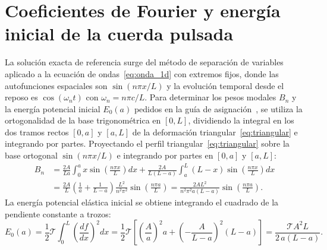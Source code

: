 \documentclass[11pt,a4paper]{article}
\begin{document}
\section{Coeficientes de Fourier y energía inicial de la cuerda pulsada}
\label{ap:coeficientes_bn}
La solución exacta de referencia surge del método de separación de variables aplicado a la ecuación de ondas~\eqref{eq:onda_1d} con extremos fijos, donde las autofunciones espaciales son $\sin(n\pi x/L)$ y la evolución temporal desde el reposo es $\cos(\omega_n t)$ con $\omega_n = n\pi c/L$. Para determinar los pesos modales $B_n$ y la energía potencial inicial $E_0(a)$ pedidos en la guía de asignación~\cite{gutierrez}, se utiliza la ortogonalidad de la base trigonométrica en $[0,L]$, dividiendo la integral en los dos tramos rectos $[0,a]$ y $[a,L]$ de la deformación triangular~\eqref{eq:triangular} e integrando por partes. Proyectando el perfil triangular~\eqref{eq:triangular} sobre la base ortogonal $\sin(n\pi x/L)$ e integrando por partes en $[0,a]$ y $[a,L]$:
\begin{align}
B_n &= \frac{2A}{La}\int_0^a x\sin\left(\frac{n\pi x}{L}\right)dx + \frac{2A}{L(L-a)}\int_a^L (L-x)\sin\left(\frac{n\pi x}{L}\right)dx \nonumber \\
&= \frac{2A}{L}\left(\frac{1}{a} + \frac{1}{L-a}\right)\frac{L^2}{n^2\pi^2}\sin\left(\frac{n\pi a}{L}\right) = \frac{2 A L^2}{n^2 \pi^2 a (L - a)} \sin\left(\frac{n\pi a}{L}\right).
\end{align}
La energía potencial elástica inicial se obtiene integrando el cuadrado de la pendiente constante a trozos:
\begin{equation}
E_0(a) = \frac{1}{2}\mathcal{T}\int_0^L \left(\frac{df}{dx}\right)^2 dx = \frac{1}{2}\mathcal{T}\left[\left(\frac{A}{a}\right)^2 a + \left(-\frac{A}{L-a}\right)^2(L-a)\right] = \frac{\mathcal{T} A^2 L}{2\,a(L-a)}.
\end{equation}
\end{document}
